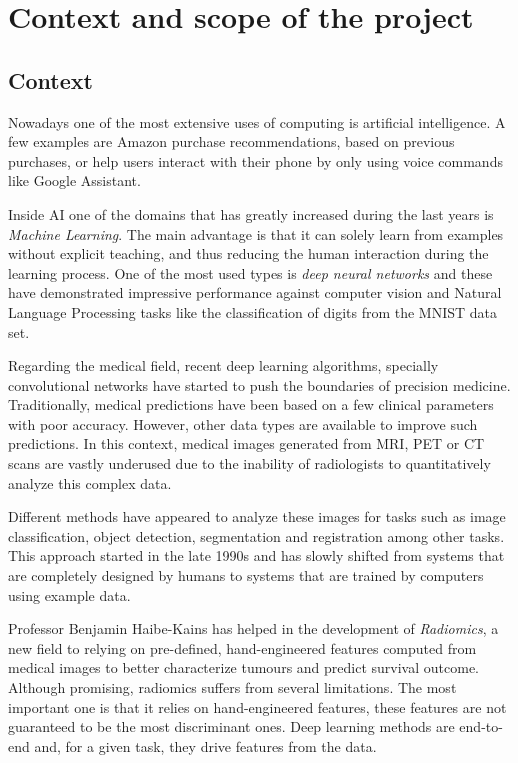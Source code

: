 
\section{Context and scope of the project}
\subsection{Context}

Nowadays one of the most extensive uses of computing is artificial intelligence. A few 
examples are Amazon purchase recommendations, based on previous purchases, or help users
interact with their phone by only using voice commands like Google Assistant. 
~\cites{neural:amazon}{neural:google-assistant}

Inside AI one of the domains that has greatly increased during the last years is 
\emph{Machine Learning}. The main advantage is that it can solely learn from examples without 
explicit teaching, and thus reducing the human interaction during the learning process. One of the 
most used types is \emph{deep neural networks} and these have demonstrated impressive performance 
against computer vision and Natural Language Processing tasks like the classification of 
digits from the MNIST data set.
~\cites{neural:MNIST}{neural:empirical-evaluation-deep-architectures}

Regarding the medical field, recent deep learning algorithms, specially convolutional networks 
have started to push the boundaries of precision medicine. 
Traditionally, medical predictions have been based on a few clinical parameters with poor accuracy.
However, other data types are available to improve such predictions. In this context, medical
images generated from MRI, PET or CT scans are vastly underused due to the inability of radiologists
to quantitatively analyze this complex data.

Different methods have appeared to analyze these images for tasks such as
image classification, object detection, segmentation and registration among other tasks. This
approach started in the late 1990s and has slowly shifted from systems that are completely designed
by humans to systems that are trained by computers using example data. 
~\cite{medical:survey-deep-learning}

Professor Benjamin Haibe-Kains has helped in the development of \emph{Radiomics}, a new field to
relying on pre-defined, hand-engineered features computed from medical images to better 
characterize tumours and predict survival outcome. Although promising, radiomics suffers from 
several limitations. The most important one is that it relies on hand-engineered features,
these features are not guaranteed to be the most discriminant ones. Deep learning methods
are end-to-end and, for a given task, they drive features from the data.
~\cite{medical:radiomics-ML-classifiers}

